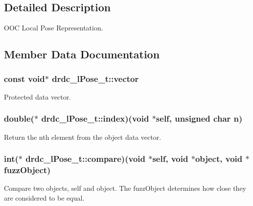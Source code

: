 \subsection{Detailed Description}
OOC Local Pose Representation. 



\subsection{Member Data Documentation}
\hypertarget{structdrdc__lPose__t_a2606cafb79c9c8391a246b5b9f04cd1}{
\subsubsection[vector]{\setlength{\rightskip}{0pt plus 5cm}const void$\ast$ {\bf drdc\_\-lPose\_\-t::vector}}}
\label{structdrdc__lPose__t_a2606cafb79c9c8391a246b5b9f04cd1}


Protected data vector. 

\hypertarget{structdrdc__lPose__t_7f347af757e1e7d642878ca00a28a806}{
\subsubsection[index]{\setlength{\rightskip}{0pt plus 5cm}double($\ast$ {\bf drdc\_\-lPose\_\-t::index})(void $\ast$self, unsigned char n)}}
\label{structdrdc__lPose__t_7f347af757e1e7d642878ca00a28a806}


Return the nth element from the object data vector. 

\hypertarget{structdrdc__lPose__t_a06dae4c38f13dd718b88a62a259dde9}{
\subsubsection[compare]{\setlength{\rightskip}{0pt plus 5cm}int($\ast$ {\bf drdc\_\-lPose\_\-t::compare})(void $\ast$self, void $\ast$object, void $\ast$fuzzObject)}}
\label{structdrdc__lPose__t_a06dae4c38f13dd718b88a62a259dde9}


Compare two objects, self and object. The fuzzObject determines how close they are considered to be equal. 

